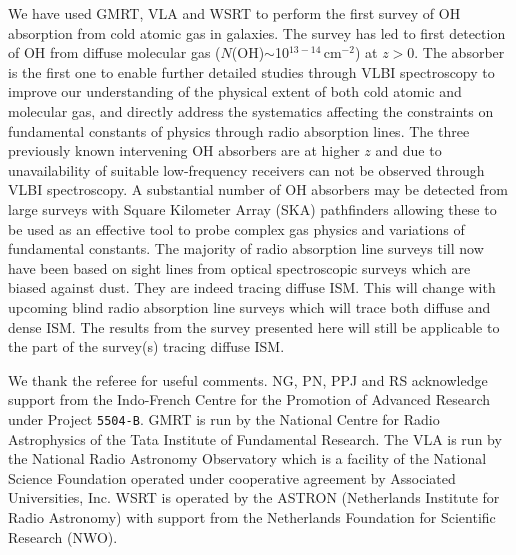 \documentclass[iop,apjl,numberedappendix,appendixfloats,twocolappendix,revtex4]{emulateapj}
\newcommand{\cmsq}{cm$^{-2}$}
\begin{document}
We have used GMRT, VLA and WSRT to perform the first survey of OH absorption from cold atomic gas in galaxies. 
The survey has led to first detection of OH from diffuse molecular gas ($N$(OH)$\sim$10$^{13-14}$\,\cmsq) at $z>0$.  
The absorber is the first one to enable further detailed studies through VLBI spectroscopy to improve our understanding 
of the physical extent of both cold atomic and molecular gas, and directly address the systematics affecting the constraints 
on fundamental constants of physics through radio absorption lines.
The three previously known intervening OH absorbers are at higher $z$ and due to unavailability of suitable low-frequency receivers 
can not be observed through VLBI spectroscopy. 
A substantial number of OH absorbers may be detected from large surveys with Square Kilometer Array (SKA) pathfinders 
allowing these to be used as an effective tool to probe complex gas physics and variations of fundamental constants.
The majority of radio absorption line surveys till now have been based on sight lines from optical spectroscopic surveys which are 
biased against dust. They are indeed tracing diffuse ISM. This will change with upcoming blind radio absorption line surveys which 
will trace both diffuse and dense ISM. The results from the survey presented here will still be applicable to the part of the 
survey(s) tracing diffuse ISM.

 
\acknowledgments

We thank the referee for useful comments.
NG, PN, PPJ and RS acknowledge support from the Indo-French Centre for the Promotion of Advanced Research 
under Project {\tt 5504-B}.
%
GMRT is run by the National Centre for Radio Astrophysics of the Tata Institute of Fundamental Research.
The VLA is run by the National Radio Astronomy Observatory which is a facility of the National Science Foundation 
operated under cooperative agreement by Associated Universities, Inc. 
WSRT is operated by the ASTRON (Netherlands Institute for Radio Astronomy) with 
support from the Netherlands Foundation for Scientific Research (NWO).

\end{document}
